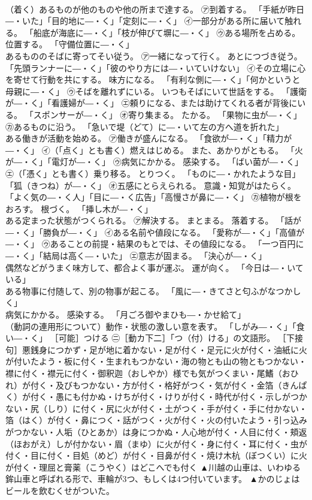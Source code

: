 \documentclass[8pt]{extreport}
\begin{document}
\begin{CJK}{UTF8}{min}
\\	（着く）あるものが他のものや他の所まで達する。 ㋐到着する。 「手紙が昨日―・いた」「目的地に―・く」「定刻に―・く」 ㋑一部分がある所に届いて触れる。 「船底が海底に―・く」「枝が伸びて塀に―・く」 ㋒ある場所を占める。 位置する。 「守備位置に―・く」 
\\	あるもののそばに寄ってそい従う。 ㋐一緒になって行く。 あとにつづき従う。 「先頭ランナーに―・く」「彼のやり方には―・いていけない」 ㋑その立場に心を寄せて行動を共にする。 味方になる。 「有利な側に―・く」「何かというと母親に―・く」 ㋒そばを離れずにいる。 いつもそばにいて世話をする。 「護衛が―・く」「看護婦が―・く」 ㋓頼りになる、または助けてくれる者が背後にいる。 「スポンサーが―・く」 ㋔寄り集まる。 たかる。 「果物に虫が―・く」 ㋕あるものに沿う。 「急いで堤（どて）に―・いて左の方へ道を折れた」 
\\	ある働きが活動を始める。 ㋐働きが盛んになる。 「食欲が―・く」「精力が―・く」 ㋑（「点く」とも書く）燃えはじめる。 また、あかりがともる。 「火が―・く」「電灯が―・く」 ㋒病気にかかる。 感染する。 「ばい菌が―・く」 ㋓（「憑く」とも書く）乗り移る。 とりつく。 「ものに―・かれたような目」「狐（きつね）が―・く」 ㋔五感にとらえられる。 意識・知覚がはたらく。 「よく気の―・く人」「目に―・く広告」「高慢さが鼻に―・く」 ㋕植物が根をおろす。 根づく。 「挿し木が―・く」 
\\	ある定まった状態がつくられる。 ㋐解決する。 まとまる。 落着する。 「話が―・く」「勝負が―・く」 ㋑ある名前や値段になる。 「愛称が―・く」「高値が―・く」 ㋒あることの前提・結果のもとでは、その値段になる。 「一つ百円に―・く」「結局は高く―・いた」 ㋓意志が固まる。 「決心が―・く」 
\\	偶然などがうまく味方して、都合よく事が運ぶ。 運が向く。 「今日は―・いている」 
\\	ある物事に付随して、別の物事が起こる。 「風に―・きてさと匂ふがなつかしく」 
\\	病気にかかる。 感染する。 「月ごろ御やまひも―・かせ給て」 
\\	（動詞の連用形について）動作・状態の激しい意を表す。 「しがみ―・く」「食い―・く」 ［可能］つける ㊁［動カ下二］「つ（付）ける」の文語形。 ［下接句］悪銭身につかず・足が地に着かない・足が付く・足元に火が付く・油紙に火が付いたよう・板に付く・生まれもつかない・海の物とも山の物ともつかない・襟に付く・襟元に付く・御釈迦（おしやか）様でも気がつくまい・尾鰭（おひれ）が付く・及びもつかない・方が付く・格好がつく・気が付く・金箔（きんぱく）が付く・愚にも付かぬ・けちが付く・けりが付く・時代が付く・示しがつかない・尻（しり）に付く・尻に火が付く・土がつく・手が付く・手に付かない・箔（はく）が付く・鼻につく・話がつく・火が付く・火の付いたよう・引っ込みがつかない・人垢（ひとあか）は身につかぬ・人心地が付く・人目に付く・頬返（ほおがえ）しが付かない・眉（まゆ）に火が付く・身に付く・耳に付く・虫が付く・目に付く・目処（めど）が付く・目鼻が付く・焼け木杭（ぼつくい）に火が付く・理屈と膏薬（こうやく）はどこへでも付く	▲川越の山車は、いわゆる鉾山車と呼ばれる形で、車輪が3つ、もしくは4つ付いています。 ▲かのじょはビールを飲むくせがついた。

\end{CJK}
\end{document}
